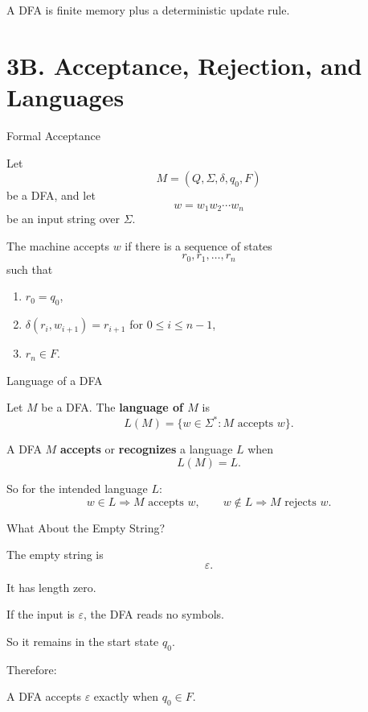 \documentclass[10pt,aspectratio=169]{beamer}
\newcommand{\eps}{\varepsilon}
\begin{document}
\begin{frame}[standout]
A DFA is finite memory plus a deterministic update rule.
\end{frame}

\section{3B. Acceptance, Rejection, and Languages}

\begin{frame}{Formal Acceptance}

Let
\[
M=(Q,\Sigma,\delta,q_0,F)
\]
be a DFA, and let
\[
w=w_1w_2\cdots w_n
\]
be an input string over $\Sigma$.


The machine accepts $w$ if there is a sequence of states
\[
r_0,r_1,\ldots,r_n
\]
such that

\begin{enumerate}
\item $r_0=q_0$,
\item $\delta(r_i,w_{i+1})=r_{i+1}$ for $0\le i\le n-1$,
\item $r_n\in F$.
\end{enumerate}

\end{frame}

\begin{frame}{Language of a DFA}

\begin{block}{}
Let $M$ be a DFA. The \textbf{language of $M$} is
\[
L(M)=\{w\in\Sigma^*: M\text{ accepts }w\}.
\]

A DFA $M$ \textbf{accepts} or \textbf{recognizes} a language $L$ when
\[
L(M)=L.
\]
\end{block}


So for the intended language $L$:
\[
w\in L \Rightarrow M\text{ accepts }w,
\qquad
w\notin L \Rightarrow M\text{ rejects }w.
\]

\end{frame}

\begin{frame}{What About the Empty String?}

The empty string is
\[
\eps.
\]

It has length zero.


If the input is $\eps$, the DFA reads no symbols.


So it remains in the start state $q_0$.


Therefore:

\begin{center}
A DFA accepts $\eps$ exactly when $q_0\in F$.
\end{center}

\end{frame}
\end{document}
